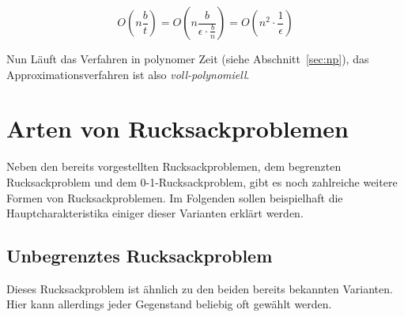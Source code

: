 \documentclass[12pt, a4paper, ngerman]{article}
\newcommand{\natnums}{\ensuremath{\mathbb{N}}}
\begin{document}
\[
  O(n\frac{b}{t})=O(n\frac{b}{\epsilon\cdot\frac{b}{n}})=O(n^2\cdot\frac{1}{\epsilon})
\]

Nun Läuft das Verfahren in polynomer Zeit (siehe Abschnitt~\ref{sec:np}),
das Approximationsverfahren ist also \emph{voll-polynomiell}.

\section{Arten von Rucksackproblemen}
Neben den bereits vorgestellten Rucksackproblemen,
dem begrenzten Rucksackproblem und dem 0-1-Rucksackproblem,
gibt es noch zahlreiche weitere Formen von Rucksackproblemen. 
Im Folgenden sollen beispielhaft die Hauptcharakteristika einiger dieser Varianten erklärt werden.







\subsection{Unbegrenztes Rucksackproblem}

Dieses Rucksackproblem ist ähnlich zu den beiden bereits bekannten Varianten.
Hier kann allerdings jeder Gegenstand beliebig oft gewählt werden.
\end{document}
